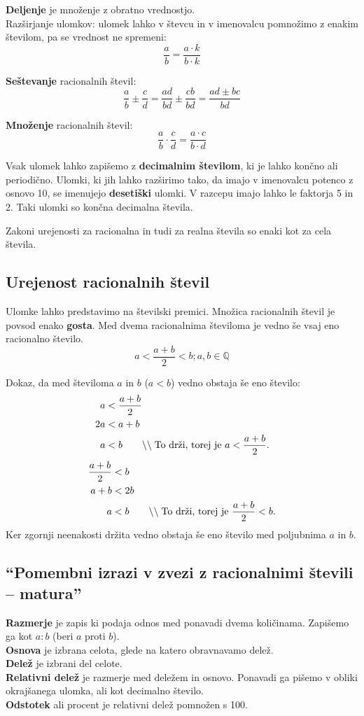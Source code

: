 \documentclass[a4paper,oneside,12pt,fleqn]{article}
\def\Q{\ensuremath{\mathbb Q}}
\newcommand\krat\cdot
\newcommand{\comment}[1]{\ensuremath{\qquad\backslash\backslash\;}\textnormal{#1}}
\numberwithin{equation}{section}
\begin{document}
\textbf{Deljenje} je množenje z obratno vrednostjo. \\
Razširjanje ulomkov: ulomek lahko v števcu in v imenovalcu pomnožimo z enakim številom, pa
se vrednost ne spremeni:
\[ \frac{a}{b} = \frac{a \krat k}{b \krat k} \]

\textbf{Seštevanje} racionalnih števil:
\[ \frac{a}{b} \pm \frac{c}{d} = \frac{ad}{bd} \pm \frac{cb}{bd} = \frac{ad \pm bc}{bd} \]

\textbf{Množenje} racionalnih števil:
\[ \frac{a}{b} \krat \frac{c}{d} = \frac{a \krat c}{b \krat d} \]

Vsak ulomek lahko zapišemo z \textbf{decimalnim številom}, ki je lahko končno ali periodično.
Ulomki, ki jih lahko razširimo tako, da imajo v imenovalcu potenco z osnovo 10, se
imenujejo \textbf{desetiški} ulomki. V razcepu imajo lahko le faktorja 5 in 2. Taki ulomki so končna
decimalna števila.

Zakoni urejenosti za racionalna in tudi za realna števila so enaki kot za cela števila.

\subsection{Urejenost racionalnih števil}
Ulomke lahko predstavimo na številski premici. Množica racionalnih števil je povsod enako
\textbf{gosta}. Med dvema racionalnima številoma je vedno še vsaj eno racionalno število.
\[ a < \frac{a+b}{2} < b; a, b \in \Q \]

Dokaz, da med številoma $a$ in $b$ ($a < b$) vedno obstaja še eno število:
\begin{align*}
  a &< \frac{a+b}{2} \\
  2a &< a+b \\
  a &< b \comment{To drži, torej je $a < \frac{a+b}{2}$.}
\end{align*}
\begin{align*}
  \frac{a+b}{2} &< b \\
  a+b &< 2b \\
  a &< b \comment{To drži, torej je $\frac{a+b}{2} < b$.}
\end{align*}
Ker zgornji neenakosti držita vedno obstaja še eno število med poljubnima $a$ in $b$.

\subsection{``Pomembni izrazi v zvezi z racionalnimi števili -- matura''}

\textbf{Razmerje} je zapis ki podaja odnos med ponavadi dvema količinama. Zapišemo ga kot $a:b$
(beri $a$ proti $b$). \\
\textbf{Osnova} je izbrana celota, glede na katero obravnavamo delež. \\
\textbf{Delež} je izbrani del celote. \\
\textbf{Relativni delež} je razmerje med deležem in osnovo. Ponavadi ga pišemo v obliki okrajšanega
ulomka, ali kot decimalno število. \\
\textbf{Odstotek} ali procent je relativni delež pomnožen s 100.
\end{document}
